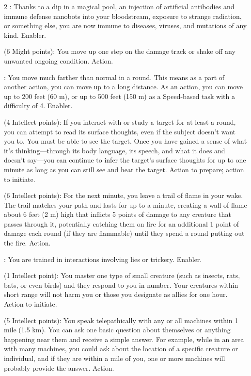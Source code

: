 \begin{multicols}{2}
: Thanks to a dip in a magical pool, an injection of artificial antibodies and immune defense nanobots into your bloodstream, exposure to strange radiation, or something else, you are now immune to diseases, viruses, and mutations of any kind. Enabler. 
 
 (6 Might points): You move up one step on the damage track or shake off any unwanted ongoing condition. Action.
 
: You move much farther than normal in a round. This means as a part of another action, you can move up to a long distance. As an action, you can move up to 200 feet (60 m), or up to 500 feet (150 m) as a Speed-based task with a difficulty of 4. Enabler. 
 
 (4 Intellect points): If you interact with or study a target for at least a round, you can attempt to read its surface thoughts, even if the subject doesn’t want you to. You must be able to see the target. Once you have gained a sense of what it’s thinking—through its body language, its speech, and what it does and doesn’t say—you can continue to infer the target’s surface thoughts for up to one minute as long as you can still see and hear the target. Action to prepare; action to initiate. 
 
 (6 Intellect points): For the next minute, you leave a trail of flame in your wake. The trail matches your path and lasts for up to a minute, creating a wall of flame about 6 feet (2 m) high that inflicts 5 points of damage to any creature that passes through it, potentially catching them on fire for an additional 1 point of damage each round (if they are flammable) until they spend a round putting out the fire. Action. 
 
: You are trained in interactions involving lies or trickery. Enabler. 
 
 (1 Intellect point): You master one type of small creature (such as insects, rats, bats, or even birds) and they respond to you in number. Your creatures within short range will not harm you or those you designate as allies for one hour. Action to initiate. 
 
 (5 Intellect points): You speak telepathically with any or all machines within 1 mile (1.5 km). You can ask one basic question about themselves or anything happening near them and receive a simple answer. For example, while in an area with many machines, you could ask about the location of a specific creature or individual, and if they are within a mile of you, one or more machines will probably provide the answer. Action. 
 

\end{multicols}

